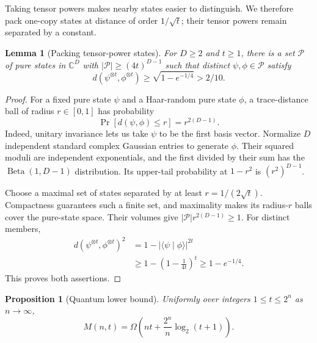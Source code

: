 \documentclass[11pt]{article}
\newtheorem{lemma}[lemma]{Lemma}
\newtheorem{proposition}[proposition]{Proposition}
\begin{document}
Taking tensor powers makes nearby states easier to distinguish.  We
therefore pack one-copy states at distance of order $1/\sqrt t$; their
tensor powers remain separated by a constant.

\begin{lemma}[Packing tensor-power states]\label{lem:quantum-packing}
For $D\ge2$ and $t\ge1$, there is a set $\mathcal P$ of pure states
in $\mathbb C^D$ with $|\mathcal P|\ge(4t)^{D-1}$ such that distinct
$\psi,\phi\in\mathcal P$ satisfy
\[
 d(\psi^{\otimes t},\phi^{\otimes t})
     \ge\sqrt{1-e^{-1/4}}>2/10.
\]
\end{lemma}

\begin{proof}
For a fixed pure state $\psi$ and a Haar-random pure state $\phi$,
a trace-distance ball of radius $r\in[0,1]$ has probability
\[
 \Pr[d(\psi,\phi)\le r]=r^{2(D-1)}.
\]
Indeed, unitary invariance lets us take $\psi$ to be the first basis
vector.  Normalize $D$ independent standard complex Gaussian entries
to generate $\phi$.  Their squared moduli are independent exponentials,
and the first divided by their sum has the
$\operatorname{Beta}(1,D-1)$ distribution.  Its upper-tail probability
at $1-r^2$ is $(r^2)^{D-1}$.

Choose a maximal set of states separated by at least
$r=1/(2\sqrt t)$.  Compactness guarantees such a finite set, and
maximality makes its radius-$r$ balls cover the pure-state space.
Their volumes give $|\mathcal P|r^{2(D-1)}\ge1$.
For distinct members,
\begin{align*}
 d(\psi^{\otimes t},\phi^{\otimes t})^2
  &=1-|\langle\psi\mid\phi\rangle|^{2t}\\
  &\ge1-\left(1-\frac1{4t}\right)^t
   \ge1-e^{-1/4}.
\end{align*}
This proves both assertions.
\end{proof}

\begin{proposition}[Quantum lower bound]\label{prop:quantum-lower}
Uniformly over integers $1\le t\le2^n$ as $n\to\infty$,
\[
 M(n,t)=\Omega\!\left(nt+\frac{2^n}{n}\log_2(t+1)\right).
\]
\end{proposition}
\end{document}
